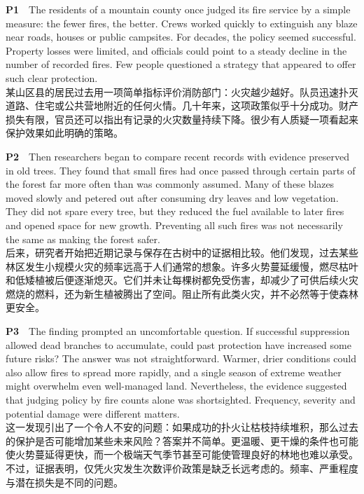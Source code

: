 \documentclass[a4paper,11pt,openany]{report}
\newcommand{\zhline}[1]{{\CJKsf\color{bodygrey}#1}}
\begin{document}
\begin{samepage}
\textbf{P1}　The residents of a mountain county once judged its fire service by a simple measure: the fewer fires, the better. Crews worked quickly to extinguish any blaze near roads, houses or public campsites. For decades, the policy seemed successful. Property losses were limited, and officials could point to a steady decline in the number of recorded fires. Few people questioned a strategy that appeared to offer such clear protection.\\
\zhline{某山区县的居民过去用一项简单指标评价消防部门：火灾越少越好。队员迅速扑灭道路、住宅或公共营地附近的任何火情。几十年来，这项政策似乎十分成功。财产损失有限，官员还可以指出有记录的火灾数量持续下降。很少有人质疑一项看起来保护效果如此明确的策略。}
\par\end{samepage}

\begin{samepage}
\textbf{P2}　Then researchers began to compare recent records with evidence preserved in old trees. They found that small fires had once passed through certain parts of the forest far more often than was commonly assumed. Many of these blazes moved slowly and petered out after consuming dry leaves and low vegetation. They did not spare every tree, but they reduced the fuel available to later fires and opened space for new growth. Preventing all such fires was not necessarily the same as making the forest safer.\\
\zhline{后来，研究者开始把近期记录与保存在古树中的证据相比较。他们发现，过去某些林区发生小规模火灾的频率远高于人们通常的想象。许多火势蔓延缓慢，燃尽枯叶和低矮植被后便逐渐熄灭。它们并未让每棵树都免受伤害，却减少了可供后续火灾燃烧的燃料，还为新生植被腾出了空间。阻止所有此类火灾，并不必然等于使森林更安全。}
\par\end{samepage}

\begin{samepage}
\textbf{P3}　The finding prompted an uncomfortable question. If successful suppression allowed dead branches to accumulate, could past protection have increased some future risks? The answer was not straightforward. Warmer, drier conditions could also allow fires to spread more rapidly, and a single season of extreme weather might overwhelm even well-managed land. Nevertheless, the evidence suggested that judging policy by fire counts alone was shortsighted. Frequency, severity and potential damage were different matters.\\
\zhline{这一发现引出了一个令人不安的问题：如果成功的扑火让枯枝持续堆积，那么过去的保护是否可能增加某些未来风险？答案并不简单。更温暖、更干燥的条件也可能使火势蔓延得更快，而一个极端天气季节甚至可能使管理良好的林地也难以承受。不过，证据表明，仅凭火灾发生次数评价政策是缺乏长远考虑的。频率、严重程度与潜在损失是不同的问题。}
\par\end{samepage}
\end{document}

